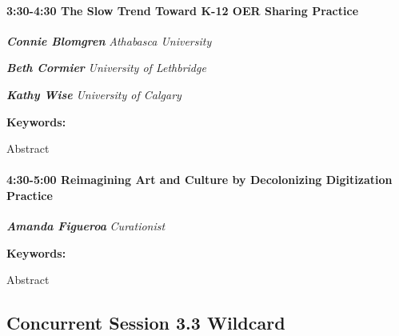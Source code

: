 \documentclass[
]{book}
\begin{document}
\begin{session}
\hypertarget{the-slow-trend-toward-k-12-oer-sharing-practice}{%
\paragraph*{\texorpdfstring{3:30-4:30 \textbar{} \textbf{The Slow Trend
Toward K-12 OER Sharing} \textbar{}
Practice}{3:30-4:30 \textbar{} The Slow Trend Toward K-12 OER Sharing \textbar{} Practice}}\label{the-slow-trend-toward-k-12-oer-sharing-practice}}

\textbf{\emph{Connie Blomgren}} \textbar{} \emph{Athabasca University}

\textbf{\emph{Beth Cormier}} \textbar{} \emph{University of Lethbridge}

\textbf{\emph{Kathy Wise}} \textbar{} \emph{University of Calgary}

\textbf{Keywords:}

Abstract
\end{session}
\begin{session}
\hypertarget{reimagining-art-and-culture-by-decolonizing-digitization-practice}{%
\paragraph*{\texorpdfstring{4:30-5:00 \textbar{} \textbf{Reimagining Art
and Culture by Decolonizing Digitization} \textbar{}
Practice}{4:30-5:00 \textbar{} Reimagining Art and Culture by Decolonizing Digitization \textbar{} Practice}}\label{reimagining-art-and-culture-by-decolonizing-digitization-practice}}

\textbf{\emph{Amanda Figueroa}} \textbar{} \emph{Curationist}

\textbf{Keywords:}

Abstract
\end{session}

\hypertarget{concurrent-session-3.3-wildcard}{%
\subsection*{Concurrent Session 3.3 \textbar{} Wildcard}\label{concurrent-session-3.3-wildcard}}
\end{document}

